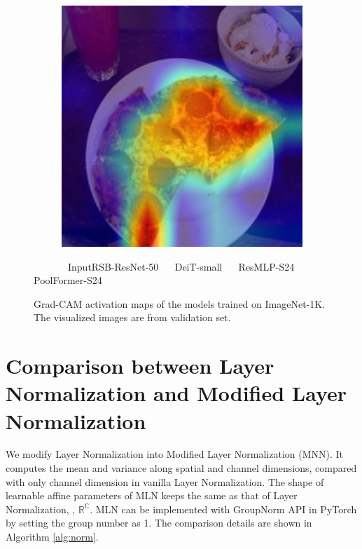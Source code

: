 \begin{figure}[t]
\begin{subfigure}[b]{0.19\textwidth}
        \includegraphics[width=1\textwidth]{figures/qualitative_results/ILSVRC2012_val_00018461_poolformer_s24.JPEG}
    \end{subfigure}  
    \begin{center}
    	 ~~~~~~~Input\qquad \qquad \quad RSB-ResNet-50 \cite{resnet_improved} \qquad ~~ DeiT-small \cite{deit} \qquad ~~ ResMLP-S24 \cite{resmlp} \qquad ~~ PoolFormer-S24
    \end{center}  
    \caption{
        \label{grad_cam} Grad-CAM \cite{gradcam} activation maps of the models trained on ImageNet-1K. The visualized images are from validation set. 
    }
\end{figure}
\section{Comparison between Layer Normalization and Modified Layer Normalization}
We modify Layer Normalization \cite{layer_norm} into Modified Layer Normalization (MNN). It computes the mean and variance along spatial and channel dimensions, compared with only channel dimension in vanilla Layer Normalization. The shape of learnable affine parameters of MLN keeps the same as that of Layer Normalization, \ie, $\mathbb{R^C}$. MLN can be implemented with GroupNorm API in PyTorch by setting the group number as 1. The comparison details are shown in Algorithm \ref{alg:norm}.



